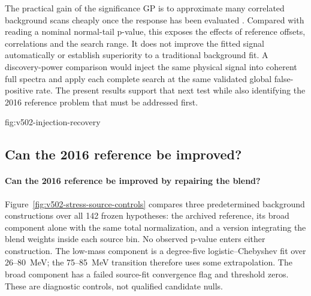 The practical gain of the significance GP is to approximate many correlated
background scans cheaply once the response has been evaluated
\cite{AnanievRead2023}. Compared with reading a nominal normal-tail p-value,
this exposes the effects of reference offsets, correlations and the search
range. It does not improve the fitted signal automatically or establish
superiority to a traditional background fit. A discovery-power comparison
would inject the same physical signal into coherent full spectra and apply
each complete search at the same validated global false-positive rate.
The present results support that next test while also identifying the
2016 reference problem that must be addressed first.

{fig:v502-injection-recovery}
\FloatBarrier

\subsection{Can the 2016 reference be improved?}
\paragraph{Can the 2016 reference be improved by repairing the blend?}
Figure~\ref{fig:v502-stress-source-controls} compares three predetermined
background constructions over all 142 frozen hypotheses: the archived
reference, its broad component alone with the same total normalization,
and a version integrating the blend weights inside each source bin.
No observed p-value enters either construction. The low-mass component is
a degree-five logistic--Chebyshev fit over 26--80~MeV; the 75--85~MeV
transition therefore uses some extrapolation. The broad component has a
failed source-fit convergence flag and threshold zeros. These are diagnostic
controls, not qualified candidate nulls.

